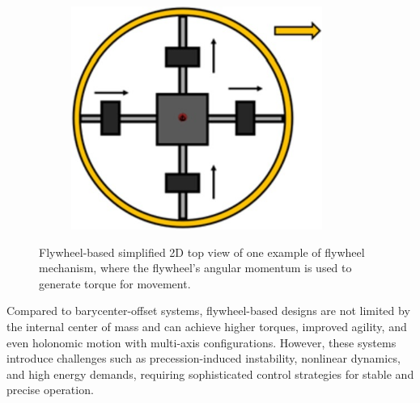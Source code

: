 \documentclass[english, bachelor, utf8]{base/thesis_telematics}
\begin{document}
\begin{figure}[ht]
        \centering

\begin{subfigure}{0.48\textwidth}

    \centering
    \includegraphics[width=0.9\textwidth]{pics/flywheel_2D_top.jpg}
    \label{fig:flywheel_2D_top}
\end{subfigure}
\caption{Flywheel-based simplified 2D top view of one example of flywheel mechanism, where the flywheel's angular momentum is used to generate torque for movement.~\cite{SpheriDrive}}
\label{fig:flywheel_sphere}
\end{figure}

Compared to barycenter-offset systems, flywheel-based designs are not limited by the internal center of mass and can achieve higher torques, improved agility, and even holonomic motion with multi-axis configurations.
However, these systems introduce challenges such as precession-induced instability, nonlinear dynamics, and high energy demands, requiring sophisticated control strategies for stable and precise operation.\cite{flywheel_hamaster_explanation}
\end{document}
